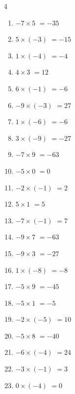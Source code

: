 \begin{multicols}{4}
\begin{enumerate}
  \item $-7\times 5$
        $=-35$

  \item $5\times (-3)$
        $=-15$

  \item $1\times (-4)$
        $=-4$

  \item $4\times 3$
        $=12$

  \item $6\times (-1)$
        $=-6$

  \item $-9\times (-3)$
        $=27$

  \item $1\times (-6)$
        $=-6$

  \item $3\times (-9)$
        $=-27$

  \item $-7\times 9$
        $=-63$

  \item $-5\times 0$
        $=0$

  \item $-2\times (-1)$
        $=2$

  \item $5\times 1$
        $=5$

  \item $-7\times (-1)$
        $=7$

  \item $-9\times 7$
        $=-63$

  \item $-9\times 3$
        $=-27$

  \item $1\times (-8)$
        $=-8$

  \item $-5\times 9$
        $=-45$

  \item $-5\times 1$
        $=-5$

  \item $-2\times (-5)$
        $=10$

  \item $-5\times 8$
        $=-40$

  \item $-6\times (-4)$
        $=24$

  \item $-3\times (-1)$
        $=3$

  \item $0\times (-4)$
        $=0$


\end{enumerate}
\end{multicols}
